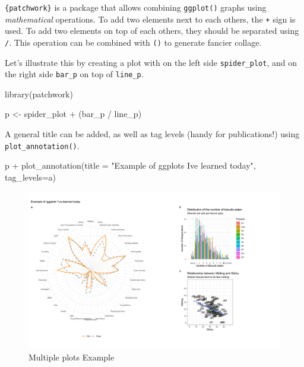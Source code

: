 \documentclass[
]{krantz}
\makeatletter
\newenvironment{Shaded}{\begin{snugshade}}{\end{snugshade}}
\newcommand{\AttributeTok}[1]{\textcolor[rgb]{0.61,0.61,0.61}{#1}}
\newcommand{\FunctionTok}[1]{\textcolor[rgb]{0,0,0}{#1}}
\newcommand{\NormalTok}[1]{#1}
\newcommand{\OtherTok}[1]{\textcolor[rgb]{0.37,0.37,0.37}{#1}}
\newcommand{\SpecialCharTok}[1]{\textcolor[rgb]{0,0,0}{#1}}
\newcommand{\StringTok}[1]{\textcolor[rgb]{0.5,0.5,0.5}{#1}}
\newenvironment{kframe}{%
\medskip{}
\setlength{\fboxsep}{.8em}
 \def\at@end@of@kframe{}%
 \ifinner\ifhmode%
  \def\at@end@of@kframe{\end{minipage}}%
  \begin{minipage}{\columnwidth}%
 \fi\fi%
 \def\FrameCommand##1{\hskip\@totalleftmargin \hskip-\fboxsep
 \colorbox{shadecolor}{##1}\hskip-\fboxsep
     \hskip-\linewidth \hskip-\@totalleftmargin \hskip\columnwidth}%
 \MakeFramed {\advance\hsize-\width
   \@totalleftmargin\z@ \linewidth\hsize
   \@setminipage}}%
 {\par\unskip\endMakeFramed%
 \at@end@of@kframe}
\renewenvironment{Shaded}{\begin{kframe}}{\end{kframe}}
\makeatother
\begin{document}
\texttt{\{patchwork\}} is a package that allows combining \texttt{ggplot()} graphs using \emph{mathematical} operations. To add two elements next to each others, the \texttt{+} sign is used. To add two elements on top of each others, they should be separated using \texttt{/}. This operation can be combined with \texttt{()} to generate fancier collage.

Let's illustrate this by creating a plot with on the left side \texttt{spider\_plot}, and on the right side \texttt{bar\_p} on top of \texttt{line\_p}.

\begin{Shaded}
\begin{Highlighting}[]
\FunctionTok{library}\NormalTok{(patchwork)}

\NormalTok{p }\OtherTok{\textless{}{-}}\NormalTok{ spider\_plot }\SpecialCharTok{+}\NormalTok{ (bar\_p }\SpecialCharTok{/}\NormalTok{ line\_p)}
\end{Highlighting}
\end{Shaded}

A general title can be added, as well as tag levels (handy for publications!) using \texttt{plot\_annotation()}.

\begin{Shaded}
\begin{Highlighting}[]
\NormalTok{p }\SpecialCharTok{+} \FunctionTok{plot\_annotation}\NormalTok{(}\AttributeTok{title =} \StringTok{"Example of \textquotesingle{}ggplots\textquotesingle{} I\textquotesingle{}ve learned today"}\NormalTok{, }
                    \AttributeTok{tag\_levels=}\StringTok{\textquotesingle{}a\textquotesingle{}}\NormalTok{)}
\end{Highlighting}
\end{Shaded}

\begin{figure}

{\centering \includegraphics[width=0.9\linewidth]{images/multiplePlot} 

}

\caption{Multiple plots Example}\label{fig:unnamed-chunk-147}
\end{figure}
\end{document}
